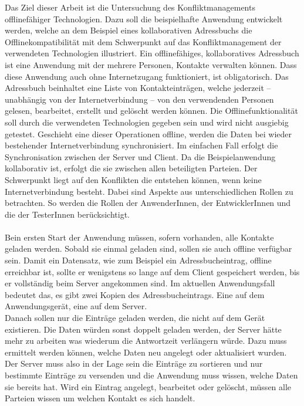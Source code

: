 Das Ziel dieser Arbeit ist die Untersuchung des Konfliktmanagements offlinefähiger Technologien.
Dazu soll die beispielhafte Anwendung entwickelt werden, welche an dem Beispiel eines kollaborativen Adressbuchs die Offlinekompatibilität mit dem Schwerpunkt auf das Konfliktmanagement der verwendeten Technologien illustriert.
Ein offlinefähiges, kollaboratives Adressbuch ist eine Anwendung mit der mehrere Personen, Kontakte verwalten können.
Dass diese Anwendung auch ohne Internetzugang funktioniert, ist obligatorisch.
Das Adressbuch beinhaltet eine Liste von Kontakteinträgen, welche jederzeit -- unabhängig von der Internetverbindung -- von den verwendenden Personen gelesen, bearbeitet, erstellt und gelöscht werden können.
Die Offlinefunktionalität soll durch die verwendeten Technologien gegeben sein und wird nicht ausgiebig getestet.
Geschieht eine dieser Operationen offline, werden die Daten bei wieder bestehender Internetverbindung synchronisiert. Im einfachen Fall erfolgt die Synchronisation zwischen der Server und Client.
Da die Beispielanwendung kollaborativ ist, erfolgt die sie zwischen allen beteiligten Parteien.
Der Schwerpunkt liegt auf den Konflikten die entstehen können, wenn keine Internetverbindung besteht.
Dabei sind Aspekte aus unterschiedlichen Rollen zu betrachten. So werden die Rollen der AnwenderInnen, der EntwicklerInnen und die der TesterInnen berücksichtigt.\\\\
%
%
Bein ersten Start der Anwendung müssen, sofern vorhanden, alle Kontakte geladen werden. Sobald sie einmal geladen sind, sollen sie auch offline verfügbar sein.
Damit ein Datensatz, wie zum Beispiel ein Adressbucheintrag, offline erreichbar ist, sollte er wenigstens so lange auf dem Client gespeichert werden, bis er vollständig beim Server angekommen sind.
Im aktuellen Anwendungsfall bedeutet das, es gibt zwei Kopien des Adressbucheintrags. Eine auf dem Anwendungsgerät, eine auf dem Server.\\
Danach sollen nur die Einträge geladen werden, die nicht auf dem Gerät existieren. Die Daten würden sonst doppelt geladen werden, der Server hätte mehr zu arbeiten was wiederum die Antwortzeit verlängern würde.
Dazu muss ermittelt werden können, welche Daten neu angelegt oder aktualisiert wurden.
Der Server muss also in der Lage sein die Einträge zu sortieren und nur bestimmte Einträge zu versenden und die Anwendung muss wissen, welche Daten sie bereits hat. Wird ein Eintrag angelegt, bearbeitet oder gelöscht, müssen alle Parteien wissen um welchen Kontakt es sich handelt.
